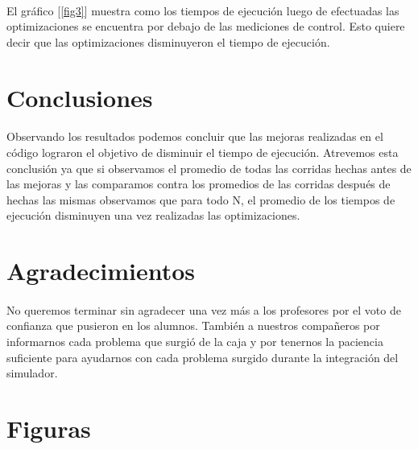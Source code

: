 \documentclass{article}
\begin{document}
\paragraph{}
El gráfico [\ref {fig3}] muestra como los tiempos de ejecución luego de efectuadas las optimizaciones se encuentra por debajo de las mediciones de control. Esto quiere decir que las optimizaciones disminuyeron el tiempo de ejecución.

\section{Conclusiones}

\paragraph{}
Observando los resultados podemos concluir que las mejoras realizadas en el código lograron el objetivo de disminuir el tiempo de ejecución. Atrevemos esta conclusión ya que si observamos el promedio de todas las corridas hechas antes de las mejoras y las comparamos contra los promedios de las corridas después de hechas las mismas observamos que para todo N, el promedio de los tiempos de ejecución disminuyen una vez realizadas las optimizaciones.

\section{Agradecimientos}

\paragraph{}
No queremos terminar sin agradecer una vez más a los profesores por el voto de confianza que pusieron en los alumnos. También a nuestros compañeros por informarnos cada problema que surgió de la caja y por tenernos la paciencia suficiente para ayudarnos con cada problema surgido durante la integración del simulador.

\clearpage

\section{Figuras}
\end{document}
